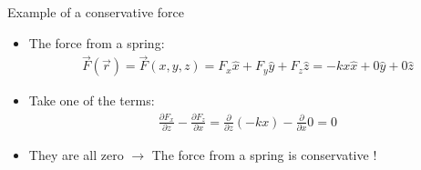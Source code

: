 \documentclass[aspectratio=169,
hyperref={colorlinks,urlcolor=blue}
]{beamer}
\begin{document}
\begin{frame}{Example of a conservative force}
\begin{itemize}
\item The force from a spring:
\begin{align*}
\vec F(\vec r)=\vec F(x,y,z)=F_x \hat x+F_y\hat y+F_z\hat z = -kx\hat x+0\hat y+0\hat z
\end{align*}
\item Take one of the terms:
\begin{align*}
\frac{\partial F_x}{\partial z}-\frac{\partial F_z}{\partial x}=\frac{\partial}{\partial z}( -kx)-\frac{\partial}{\partial x}0=0
\end{align*}
\item They are all zero $\rightarrow$ The force from a spring is conservative !
\end{itemize}
\end{frame}


\end{document}
